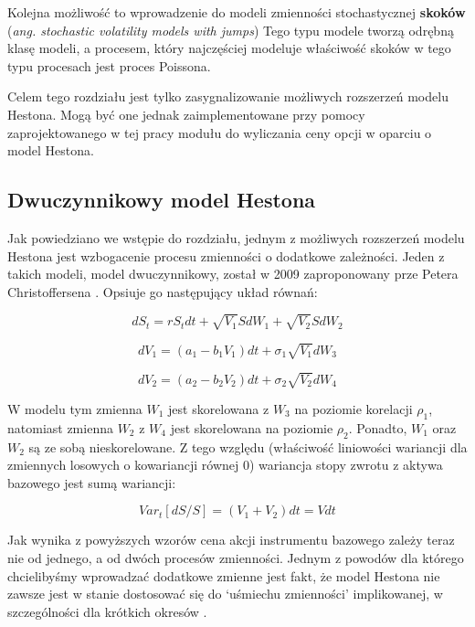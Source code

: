 \documentclass{pracamgr}
\begin{document}
Kolejna możliwość to wprowadzenie do modeli zmienności stochastycznej \textbf{skoków} (\textit{ang. stochastic volatility models with jumps})
Tego typu modele tworzą odrębną klasę modeli, a procesem, który najczęściej modeluje właściwość
skoków w tego typu procesach jest proces Poissona.

Celem tego rozdziału jest tylko zasygnalizowanie możliwych rozszerzeń modelu Hestona.
Mogą być one jednak zaimplementowane przy pomocy zaprojektowanego w tej pracy modułu 
do wyliczania ceny opcji w oparciu o model Hestona. 

\subsection{Dwuczynnikowy model Hestona} %
\label{sec:modelDwuczynnikowy}
Jak powiedziano we wstępie do rozdziału, jednym z możliwych rozszerzeń modelu Hestona jest wzbogacenie
procesu zmienności o dodatkowe zależności. 
Jeden z takich modeli, model dwuczynnikowy, został w 2009 zaproponowany prze
Petera Christoffersena  \cite{Christoffersen}.
Opsiuje go następujący układ równań:

\begin{equation}
dS_t  = r S_t dt + \sqrt{V_1} S dW_1 + \sqrt{V_2} S dW_2
\end{equation} 

\begin{equation}
dV_1  = (a_1 - b_1 V_1)dt + \sigma_1 \sqrt{V_1} dW_3 
\end{equation}

\begin{equation}
dV_2  = (a_2 - b_2 V_2)dt + \sigma_2 \sqrt{V_2} dW_4 
\end{equation}

W modelu tym zmienna $W_1$ jest skorelowana z $W_3$ na poziomie korelacji $\rho_1$, natomiast
zmienna $W_2$ z $W_4$ jest skorelowana na poziomie $\rho_2$. Ponadto, $W_1$ oraz $W_2$ są ze sobą nieskorelowane. Z tego względu (właściwość
liniowości wariancji dla zmiennych losowych o kowariancji równej $0$) wariancja stopy zwrotu z aktywa
bazowego jest sumą wariancji:

\begin{equation}
  Var_t[dS/S] = (V_1 + V_2)dt = Vdt
\end{equation}

Jak wynika z powyższych wzorów cena akcji instrumentu bazowego zależy teraz nie od jednego, a od 
dwóch procesów zmienności.
Jednym z powodów dla którego chcielibyśmy wprowadzać dodatkowe zmienne jest fakt, że model
Hestona nie zawsze jest w stanie dostosować się do `uśmiechu zmienności'  implikowanej, w szczególności dla krótkich okresów \cite{HestonExtensions}.
\end{document}
